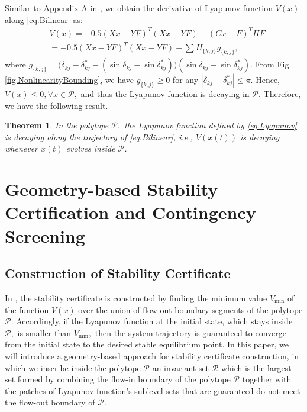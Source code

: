 \documentclass[final]{IEEEtran}
\newtheorem{theorem}{Theorem}\newtheorem{remark}{Remark}\newtheorem{lemma}{Lemma}\usepackage{color}
\begin{document}
Similar to Appendix A in \cite{Vu:2014}, we obtain the derivative of Lyapunov function $V(x)$ along
\eqref{eq.Bilinear} as:
\begin{align}
\label{eq.dotV} &\dot{V}(x)=-0.5(Xx-YF)^T(Xx-YF)
 - (Cx-F)^THF \nonumber \\
 & =-0.5(Xx-YF)^T(Xx-YF)
    - \sum H_{\{k,j\}}g_{\{k,j\}},
  \end{align}
  where $g_{\{k,j\}}=\big(\delta_{kj}-\delta_{kj}^*-(\sin\delta_{kj}-\sin\delta_{kj}^*)\big)(\sin\delta_{kj}-\sin\delta_{kj}^*).$
  From Fig. \ref{fig.NonlinearityBounding}, we have $g_{\{k,j\}} \ge 0$
  for any $|\delta_{kj}+\delta_{kj}^*|\le \pi.$ Hence, $\dot{V}(x) \le 0, \forall x \in \mathcal{P},$
  and thus the Lyapunov function is decaying in  $\mathcal{P}.$
   Therefore, we have the following result.
\begin{theorem}
\label{thr.LyapunovDecrease} \emph{In the polytope $\mathcal{P},$
the Lyapunov function defined by \eqref{eq.Lyapunov} is decaying
along the trajectory of \eqref{eq.Bilinear}, i.e., $V(x(t))$ is
decaying whenever $x(t)$ evolves inside $\mathcal{P}$.}
\end{theorem}

\section{Geometry-based Stability Certification and Contingency Screening}
\label{sec:construction}

\subsection{Construction of Stability Certificate}
In \cite{Vu:2014}, the stability certificate is constructed by finding the
minimum value $V_{\min}$ of the function $V(x)$ over the union
of flow-out boundary segments of the polytope $\mathcal{P}.$ Accordingly, if the 
Lyapunov function at the initial state, which stays inside $\mathcal{P},$ is smaller than $V_{\min},$
then the system trajectory is guaranteed to converge from the initial state to the desired stable equilibrium point.
In this paper, we will introduce a geometry-based approach for stability certificate construction,
in which we inscribe  inside the polytope $\mathcal{P}$ an invariant set $\mathcal{R}$ which is the largest set formed by combining the flow-in boundary of the polytope $\mathcal{P}$ together  with the patches of Lyapunov function's sublevel sets that are guaranteed do not meet the flow-out boundary of $\mathcal{P}$. 
\end{document}

